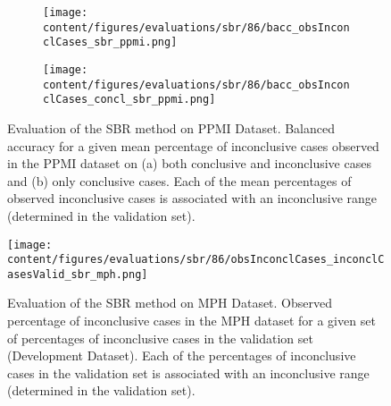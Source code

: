 \begin{figure}[t]
  \begin{subfigure}{0.9\textwidth}
    \centering
    \texttt{[image: content/figures/evaluations/sbr/86/bacc\_obsInconclCases\_sbr\_ppmi.png]}
    \subcaption{}
    \label{fig:bacc_obsInconclCases_sbr_ppmi}
  \end{subfigure}
  \hfill
  \begin{subfigure}{0.9\textwidth}
    \centering
    \texttt{[image: content/figures/evaluations/sbr/86/bacc\_obsInconclCases\_concl\_sbr\_ppmi.png]}
    \subcaption{}
    \label{fig:bacc_obsInconclCases_concl_sbr_ppmi}
  \end{subfigure}

  \caption{Evaluation of the SBR method on PPMI Dataset.
  Balanced accuracy for a given mean percentage of inconclusive cases observed in the PPMI dataset on 
  (a) both conclusive and inconclusive cases and (b) only conclusive cases. 
  Each of the mean percentages of observed inconclusive cases is associated 
  with an inconclusive range (determined in the validation set). }
  \label{fig:bacc_obsInconclCases_sbr_ppmi_full}
\end{figure}





\begin{figure}[h]
  \centering
  \texttt{[image: content/figures/evaluations/sbr/86/obsInconclCases\_inconclCasesValid\_sbr\_mph.png]}
  \caption{Evaluation of the SBR method on MPH Dataset.
  Observed percentage of inconclusive cases in the MPH dataset 
  for a given set of percentages of inconclusive cases in the validation set (Development Dataset).
  Each of the percentages of inconclusive cases in the validation set is associated 
  with an inconclusive range (determined in the validation set).} 
  \label{fig:obsInconclCases_inconclCasesValid_sbr_mph}
\end{figure} 


